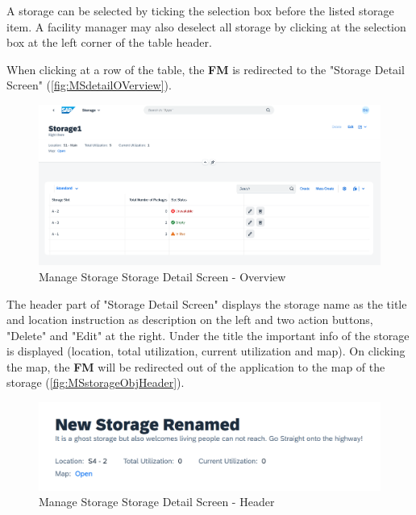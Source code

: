 A storage can be selected by ticking the selection box before the listed storage item. A facility manager may also deselect all storage by clicking at the selection box at the left corner of the table header.


When clicking at a row of the table, the \textbf{FM} is redirected to the "Storage Detail Screen" (\autoref{fig:MSdetailOVerview}).


\begin{figure}[H]
	\centering
	\includegraphics[width=1\linewidth]{images/user_doc/storage/updatedSlotEditDelete/StorageObjectOverview.png}
	\caption{Manage Storage Storage Detail Screen - Overview}
	\label{fig:MSdetailOVerview}
\end{figure}

The header part of "Storage Detail Screen" displays the storage name as the title and location instruction as description on the left and two action buttons, "Delete" and "Edit" at the right.
Under the title the important info of the storage is displayed (location, total utilization, current utilization and map). On clicking the map, the \textbf{FM} will be redirected out of the application to the map of the storage (\autoref{fig:MSstorageObjHeader}).

\begin{figure}[!htb] %
	\centering
	\includegraphics[width=1\linewidth]{images/user_doc/storage/StorageObjectPage/StorageObjHeader.png}
	\caption{Manage Storage Storage Detail Screen - Header}
	\label{fig:MSstorageObjHeader}
\end{figure}

